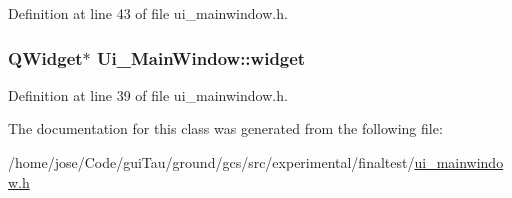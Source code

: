 Definition at line 43 of file ui\-\_\-mainwindow.\-h.

\hypertarget{class_ui___main_window_ab676f235c393f334b7c07935d4007925}{
\subsubsection[{widget}]{\setlength{\rightskip}{0pt plus 5cm}Q\-Widget$\ast$ Ui\-\_\-\-Main\-Window\-::widget}}\label{class_ui___main_window_ab676f235c393f334b7c07935d4007925}


Definition at line 39 of file ui\-\_\-mainwindow.\-h.



The documentation for this class was generated from the following file\-:\begin{DoxyCompactItemize}
\item 
/home/jose/\-Code/gui\-Tau/ground/gcs/src/experimental/finaltest/\hyperlink{ui__mainwindow_8h}{ui\-\_\-mainwindow.\-h}\end{DoxyCompactItemize}
